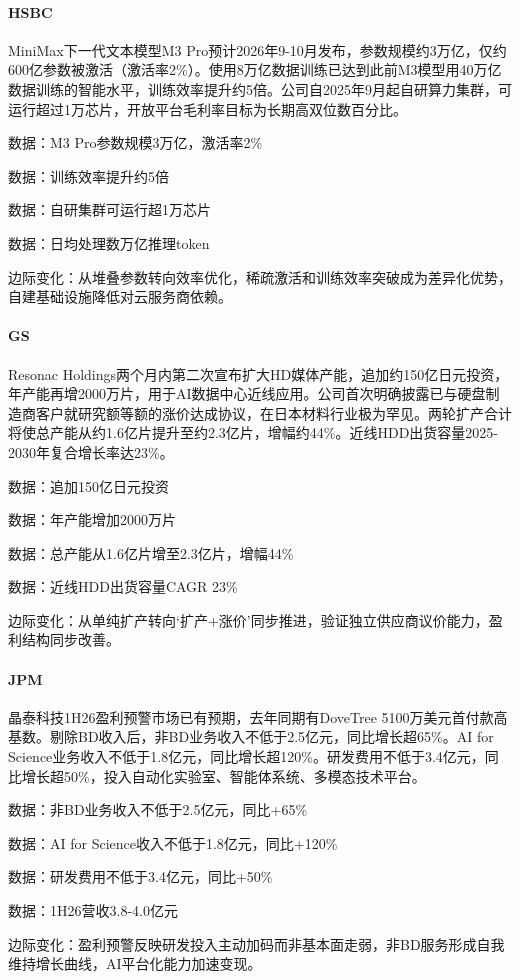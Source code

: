 \documentclass[11pt]{ctexart}
\begin{document}
\paragraph{HSBC} MiniMax下一代文本模型M3 Pro预计2026年9-10月发布，参数规模约3万亿，仅约600亿参数被激活（激活率2\%）。使用8万亿数据训练已达到此前M3模型用40万亿数据训练的智能水平，训练效率提升约5倍。公司自2025年9月起自研算力集群，可运行超过1万芯片，开放平台毛利率目标为长期高双位数百分比。
{\small\color{refgray}数据：M3 Pro参数规模3万亿，激活率2\%\par}
{\small\color{refgray}数据：训练效率提升约5倍\par}
{\small\color{refgray}数据：自研集群可运行超1万芯片\par}
{\small\color{refgray}数据：日均处理数万亿推理token\par}
{\small\color{refgray}边际变化：从堆叠参数转向效率优化，稀疏激活和训练效率突破成为差异化优势，自建基础设施降低对云服务商依赖。\par}
\paragraph{GS} Resonac Holdings两个月内第二次宣布扩大HD媒体产能，追加约150亿日元投资，年产能再增2000万片，用于AI数据中心近线应用。公司首次明确披露已与硬盘制造商客户就研究额等额的涨价达成协议，在日本材料行业极为罕见。两轮扩产合计将使总产能从约1.6亿片提升至约2.3亿片，增幅约44\%。近线HDD出货容量2025-2030年复合增长率达23\%。
{\small\color{refgray}数据：追加150亿日元投资\par}
{\small\color{refgray}数据：年产能增加2000万片\par}
{\small\color{refgray}数据：总产能从1.6亿片增至2.3亿片，增幅44\%\par}
{\small\color{refgray}数据：近线HDD出货容量CAGR 23\%\par}
{\small\color{refgray}边际变化：从单纯扩产转向‘扩产+涨价’同步推进，验证独立供应商议价能力，盈利结构同步改善。\par}
\paragraph{JPM} 晶泰科技1H26盈利预警市场已有预期，去年同期有DoveTree 5100万美元首付款高基数。剔除BD收入后，非BD业务收入不低于2.5亿元，同比增长超65\%。AI for Science业务收入不低于1.8亿元，同比增长超120\%。研发费用不低于3.4亿元，同比增长超50\%，投入自动化实验室、智能体系统、多模态技术平台。
{\small\color{refgray}数据：非BD业务收入不低于2.5亿元，同比+65\%\par}
{\small\color{refgray}数据：AI for Science收入不低于1.8亿元，同比+120\%\par}
{\small\color{refgray}数据：研发费用不低于3.4亿元，同比+50\%\par}
{\small\color{refgray}数据：1H26营收3.8-4.0亿元\par}
{\small\color{refgray}边际变化：盈利预警反映研发投入主动加码而非基本面走弱，非BD服务形成自我维持增长曲线，AI平台化能力加速变现。\par}
\end{document}
